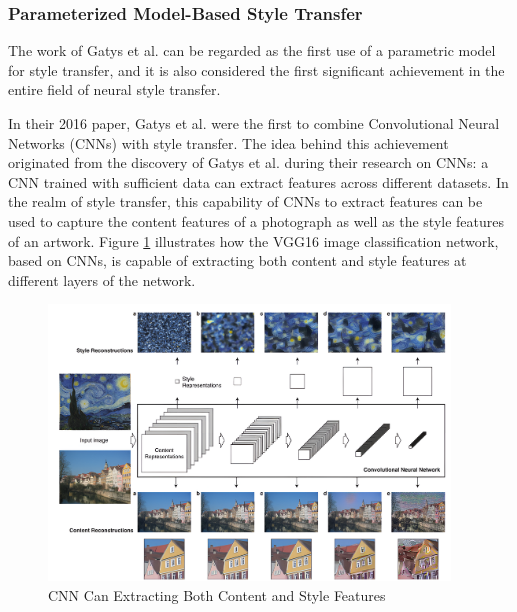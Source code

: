 \documentclass[preprint,12pt]{elsarticle}
\begin{document}
\subsubsection{Parameterized Model-Based Style Transfer}

The work of Gatys et al. \citep{02gatys2016image} can be regarded as the first use of a parametric model for style transfer, and it is also considered the first significant achievement in the entire field of neural style transfer.

In their 2016 paper\citep{02gatys2016image}, Gatys et al. were the first to combine Convolutional Neural Networks (CNNs) with style transfer. The idea behind this achievement originated from the discovery of Gatys et al. during their research on CNNs: a CNN trained with sufficient data can extract features across different datasets\citep{02gatys2016image}. In the realm of style transfer, this capability of CNNs to extract features can be used to capture the content features of a photograph as well as the style features of an artwork. Figure \ref{fig3_VGGs_Ability} illustrates how the VGG16 image classification network, based on CNNs, is capable of extracting both content and style features at different layers of the network.

\begin{figure}[!htbp]%
    \centering%
    \includegraphics[width=0.95\textwidth]{Figure_3__CNN_Can_Extracting_Both_Content_and_Style_Features.png}
    \caption{CNN Can Extracting Both Content and Style Features}\label{fig3_VGGs_Ability}
\end{figure}
\end{document}
